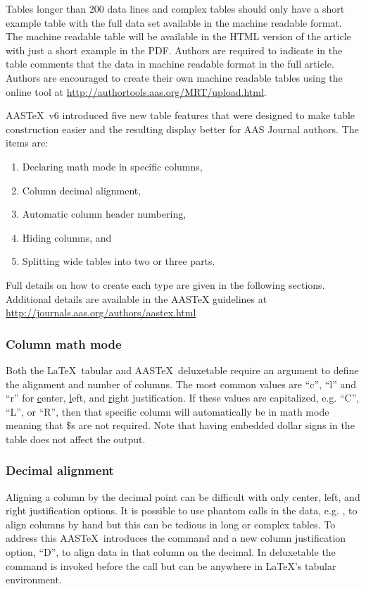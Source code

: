 \documentclass{aastex63}
\newcommand\aastex{AAS\TeX}
\newcommand\latex{La\TeX}
\begin{document}
Tables longer than 200 data lines and complex tables should only have a
short example table with the full data set available in the machine
readable format.  The machine readable table will be available in the HTML
version of the article with just a short example in the PDF. Authors are
required to indicate in the table comments that the data in machine 
readable format in the full article.
Authors are encouraged to create their own machine
readable tables using the online tool at
\url{http://authortools.aas.org/MRT/upload.html}.

\aastex\ v6 introduced five new table features that were designed to make
table construction easier and the resulting display better for AAS Journal
authors.  The items are:

\begin{enumerate}
\item Declaring math mode in specific columns,
\item Column decimal alignment, 
\item Automatic column header numbering,
\item Hiding columns, and
\item Splitting wide tables into two or three parts.
\end{enumerate}

Full details on how to create each type are given in the following 
sections. Additional details are available in the AASTeX
guidelines at \url{http://journals.aas.org/authors/aastex.html}

\subsubsection{Column math mode}

Both the \latex\ tabular and \aastex\ deluxetable require an argument to
define the alignment and number of columns.  The most common values are
``c'', ``l'' and ``r'' for \underline{c}enter, \underline{l}eft, and
\underline{r}ight justification.  If these values are capitalized, e.g.
``C'', ``L'', or ``R'', then that specific column will automatically be in math
mode meaning that \$s are not required.  Note that having embedded dollar
signs in the table does not affect the output. 

\subsubsection{Decimal alignment}

Aligning a column by the decimal point can be difficult with only center,
left, and right justification options.  It is possible to use phantom calls
in the data, e.g. {\tt\string\phn}, to align columns by hand but this can
be tedious in long or complex tables.  To address this \aastex\ introduces
the {\tt\string\decimals} command and a new column justification option,
``D'', to align data in that column on the decimal.  In deluxetable the
{\tt\string\decimals} command is invoked before the {\tt\string\startdata}
call but can be anywhere in \latex's tabular environment.  
\end{document}
